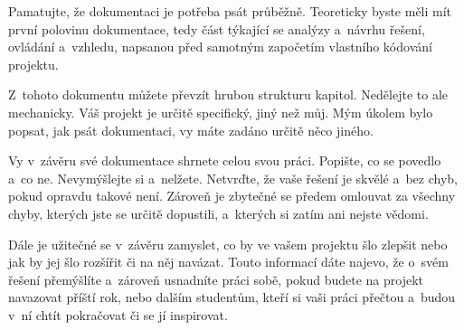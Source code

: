 Pamatujte, že dokumentaci je potřeba psát průběžně. Teoreticky byste měli mít první polovinu dokumentace, tedy část týkající se analýzy a~návrhu řešení, ovládání a~vzhledu, napsanou před samotným započetím vlastního kódování projektu.

Z~tohoto dokumentu můžete převzít hrubou strukturu kapitol. Nedělejte to ale mechanicky. Váš projekt je určitě specifický, jiný než můj. Mým úkolem bylo popsat, jak psát dokumentaci, vy máte zadáno určitě něco jiného.

\medskip
Vy v~závěru své dokumentace shrnete celou svou práci. Popište, co se povedlo a~co ne. Nevymýšlejte si a~nelžete. Netvrďte, že vaše řešení je skvělé a~bez chyb, pokud opravdu takové není. Zároveň je zbytečné se předem omlouvat za všechny chyby, kterých jste se určitě dopustili, a~kterých si zatím ani nejste vědomi.

Dále je užitečné se v~závěru zamyslet, co by ve vašem projektu šlo zlepšit nebo jak by jej šlo rozšířit či na něj navázat. Touto informací dáte najevo, že o~svém řešení přemýšlíte a~zároveň usnadníte práci sobě, pokud budete na projekt navazovat příští rok, nebo dalším studentům, kteří si vaši práci přečtou a~budou v~ní chtít pokračovat či se jí inspirovat.

